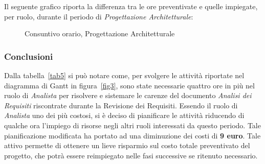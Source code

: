 \newpage
\noindent Il seguente grafico riporta la differenza tra le ore preventivate e quelle impiegate, per ruolo, durante il periodo di \textit{Progettazione Architetturale}:
\begin{figure}[h]
	\centering
	\caption{Consuntivo orario, Progettazione Architetturale}
\end{figure}

\subsubsection{Conclusioni}
Dalla tabella~\ref{tab5} si può notare come, per svolgere le attività riportate nel diagramma di \gls{Gantt} in figura~\ref{fig3}, sono state necessarie quattro ore in più nel ruolo di \textit{Analista} per risolvere e sistemare le carenze del documento \textit{Analisi dei Requisiti} riscontrate durante la Revisione dei Requisiti. Essendo il ruolo di \textit{Analista} uno dei più costosi, si è deciso di pianificare le attività riducendo di qualche ora l'impiego di risorse negli altri ruoli interessati da questo periodo. Tale pianificazione modificata ha portato ad una diminuzione dei costi di \textbf{9 euro}. Tale attivo permette di ottenere un lieve risparmio sul costo totale preventivato del progetto, che potrà essere reimpiegato nelle fasi successive se ritenuto necessario. 
